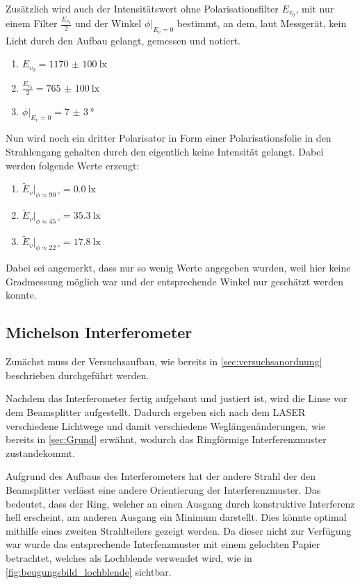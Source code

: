 \documentclass[12pt,english,ngerman]{scrartcl}
\begin{document}
Zusätzlich wird auch der Intensitätswert ohne Polarisationsfilter $E_{v_0}$, mit nur
einem Filter $\frac{E_{v_0}}{2}$ und der Winkel  $\phi|_{E_v=0}$ bestimmt, an dem, laut Messgerät, kein Licht durch
den Aufbau gelangt, gemessen und notiert.

\begin{enumerate}
	\item $E_{v_0}=\SI{1170(100)}{\lux}$
	\item $\frac{E_{v_0}}{2}=\SI{765(100)}{\lux}$
	\item $\phi|_{E_v=0}=\SI{7(3)}{\degree}$
\end{enumerate}

Nun wird noch ein dritter Polarisator in Form einer Polarisationsfolie in den
Strahlengang gehalten durch den eigentlich keine Intensität gelangt. Dabei
werden folgende Werte erzeugt:

\begin{enumerate}
	\item $\tilde{E}_v|_{\phi\approx\SI{90}{\degree}}=\SI{0.0}{\lux}$
	\item $\tilde{E}_v|_{\phi\approx\SI{45}{\degree}}=\SI{35.3}{\lux}$
	\item $\tilde{E}_v|_{\phi\approx\SI{22}{\degree}}=\SI{17.8}{\lux}$
\end{enumerate}

Dabei sei angemerkt, dass nur so wenig Werte angegeben wurden, weil hier keine
Gradmessung möglich war und der entsprechende Winkel nur geschätzt werden
konnte.

\subsection{Michelson Interferometer}

Zunächst muss der Versuchsaufbau, wie bereits in
\autoref{sec:versuchsanordnung} beschrieben durchgeführt werden.

Nachdem das Interferometer fertig aufgebaut und justiert ist, wird die Linse
vor dem Beamsplitter aufgestellt. Dadurch ergeben sich nach dem LASER
verschiedene Lichtwege und damit verschiedene Weglängenänderungen, wie bereits
in \autoref{sec:Grund} erwähnt, wodurch das Ringförmige Interferenzmuster
zustandekommt.

Aufgrund des Aufbaus des Interferometers hat der andere Strahl der den
Beamsplitter verlässt eine andere Orientierung der Interferenzmuster. Das
bedeutet, dass der Ring, welcher an einen Ausgang durch konstruktive
Interferenz hell erscheint, am anderen Ausgang ein Minimum darstellt. Dies
könnte optimal mithilfe eines zweiten Strahlteilers gezeigt werden. Da dieser
nicht zur Verfügung war wurde das entsprechende Interfenzmuster mit einem
gelochten Papier betrachtet, welches als Lochblende verwendet wird, wie in
\autoref{fig:beugungsbild_lochblende} sichtbar.
\end{document}
